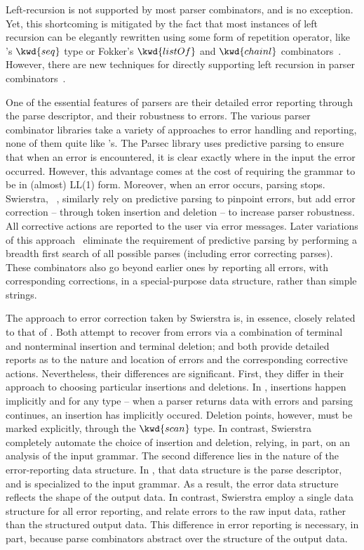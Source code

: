 Left-recursion is not supported by most parser combinators, and \ddc{} is no exception. Yet, this shortcoming is mitigated by the fact that most instances of left recursion can be elegantly rewritten using some form of repetition operator, like \ddc{}'s $\kwd{seq}$ type or
Fokker's $\kwd{listOf}$ and $\kwd{chainl}$ combinators~\cite{fokker:functional-parsers}. However, there are new techniques for directly supporting left recursion in parser combinators~\cite{frost+:padl-pcombs}.

One of the essential features of \ddc{} parsers are their detailed error reporting through the parse descriptor, and their robustness to errors. The various parser combinator libraries take a variety of approaches to error handling and reporting, none of them quite like \ddc{}'s. The Parsec library uses predictive parsing to ensure that when an error is encountered, it is clear exactly where in the input the error occurred. However, this advantage comes at the cost of requiring the grammar to be in (almost) LL(1) form. Moreover, when an error occurs, parsing stops. Swierstra, \etal{}~\cite{swierstra+:deterministic-error-correcting}, similarly rely on predictive parsing to pinpoint errors, but add error correction -- through token insertion and deletion -- to increase parser robustness. All corrective actions are reported to the user via error messages. Later variations of this approach~\cite{swierstra+:fast-error-correcting,swierstra:toys-parsing} eliminate the requirement of predictive parsing by performing a breadth first search of all possible parses (including error correcting parses). These combinators also go beyond earlier ones by reporting all errors, with corresponding corrections, in a special-purpose data structure, rather than simple strings.

The approach to error correction taken by Swierstra \etal{} is, in essence, closely related to that of \ddc{}. Both attempt to recover from errors via a combination of terminal and nonterminal insertion and terminal deletion; and both provide detailed reports as to the nature and location of errors and the corresponding corrective actions. Nevertheless, their differences are significant. First, they differ in their approach to choosing particular insertions and deletions. In \ddc{}, insertions happen implicitly and for any type -- when a parser returns data with errors and parsing continues, an insertion has implicitly occured. Deletion points, however, must be marked explicitly, through the $\kwd{scan}$ type. In contrast, Swierstra \etal{} completely automate the choice of insertion and deletion, relying, in part, on an analysis of the input grammar. The second difference lies in the nature of the error-reporting data structure. In \ddc{}, that data structure is the parse descriptor, and is specialized to the input grammar. As a result, the error data structure reflects the shape of the output data. In contrast, Swierstra \etal{} employ a single data structure for all error reporting, and relate errors to the raw input data, rather than the structured output data. This difference in error reporting is necessary, in part, because parse combinators abstract over the structure of the output data. 

